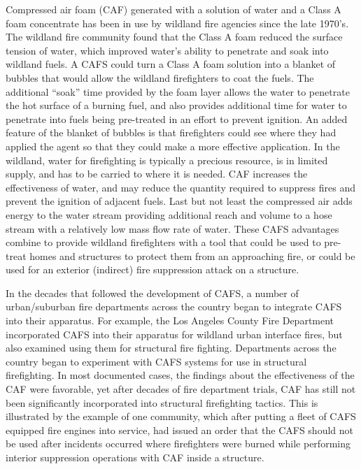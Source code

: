 \documentclass[12pt,oneside]{book}
\begin{document}
Compressed air foam (CAF) generated with a solution of water and a Class A foam concentrate has been in use by wildland fire agencies since the late 1970's. The wildland fire community found that the Class A foam reduced the surface tension of water, which improved water's ability to penetrate and soak into wildland fuels. A CAFS could turn a Class A foam solution into a blanket of bubbles that would allow the wildland firefighters to coat the fuels. The additional ``soak'' time provided by the foam layer allows the water to penetrate the hot surface of a burning fuel, and also provides additional time for water to penetrate into fuels being pre-treated in an effort to prevent ignition. An added feature of the blanket of bubbles is that firefighters could see where they had applied the agent so that they could make a more effective application. In the wildland, water for firefighting is typically a precious resource, is in limited supply, and has to be carried to where it is needed. CAF increases the effectiveness of water, and may reduce the quantity required to suppress fires and prevent the ignition of adjacent fuels. Last but not least the compressed air adds energy to the water stream providing additional reach and volume to a hose stream with a relatively low mass flow rate of water. These CAFS advantages combine to provide wildland firefighters with a tool that could be used to pre-treat homes and structures to protect them from an approaching fire, or could be used for an exterior (indirect) fire suppression attack on a structure.

In the decades that followed the development of CAFS, a number of urban/suburban fire departments across the country began to integrate CAFS into their apparatus. For example, the Los Angeles County Fire Department incorporated CAFS into their apparatus for wildland urban interface fires, but also examined using them for structural fire fighting. Departments across the country began to experiment with CAFS systems for use in structural firefighting. In most documented cases, the findings about the effectiveness of the CAF were favorable, yet after decades of fire department trials, CAF has still not been significantly incorporated into structural firefighting tactics. This is illustrated by the example of one community, which after putting a fleet of CAFS equipped fire engines into service, had issued an order that the CAFS should not be used after incidents occurred where firefighters were burned while performing interior suppression operations with CAF inside a structure.
\end{document}

